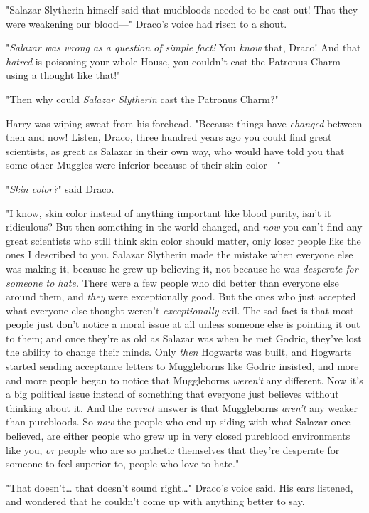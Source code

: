"Salazar Slytherin himself said that mudbloods needed to be cast out! That they 
were weakening our blood---" Draco's voice had risen to a shout.

"\emph{Salazar was wrong as a question of simple fact!} You \emph{know} that, 
Draco! And that \emph{hatred} is poisoning your whole House, you couldn't cast 
the Patronus Charm using a thought like that!"

"Then why could \emph{Salazar Slytherin} cast the Patronus Charm?"

Harry was wiping sweat from his forehead. "Because things have \emph{changed} 
between then and now! Listen, Draco, three hundred years ago you could find 
great scientists, as great as Salazar in their own way, who would have told you 
that some other Muggles were inferior because of their skin color---"

"\emph{Skin color?}" said Draco.

"I know, skin color instead of anything important like blood purity, isn't it 
ridiculous? But then something in the world changed, and \emph{now} you can't 
find any great scientists who still think skin color should matter, only loser 
people like the ones I described to you. Salazar Slytherin made the mistake 
when everyone else was making it, because he grew up believing it, not because 
he was \emph{desperate for someone to hate.} There were a few people who did 
better than everyone else around them, and \emph{they} were exceptionally good. 
But the ones who just accepted what everyone else thought weren't 
\emph{exceptionally} evil. The sad fact is that most people just don't notice a 
moral issue at all unless someone else is pointing it out to them; and once 
they're as old as Salazar was when he met Godric, they've lost the ability to 
change their minds. Only \emph{then} Hogwarts was built, and Hogwarts started 
sending acceptance letters to Muggleborns like Godric insisted, and more and 
more people began to notice that Muggleborns \emph{weren't} any different. Now 
it's a big political issue instead of something that everyone just believes 
without thinking about it. And the \emph{correct} answer is that Muggleborns 
\emph{aren't} any weaker than purebloods. So \emph{now} the people who end up 
siding with what Salazar once believed, are either people who grew up in very 
closed pureblood environments like you, \emph{or} people who are so pathetic 
themselves that they're desperate for someone to feel superior to, people who 
love to hate."

"That doesn't{\ldots} that doesn't sound right{\ldots}" Draco's voice said. His 
ears listened, and wondered that he couldn't come up with anything better to 
say.


